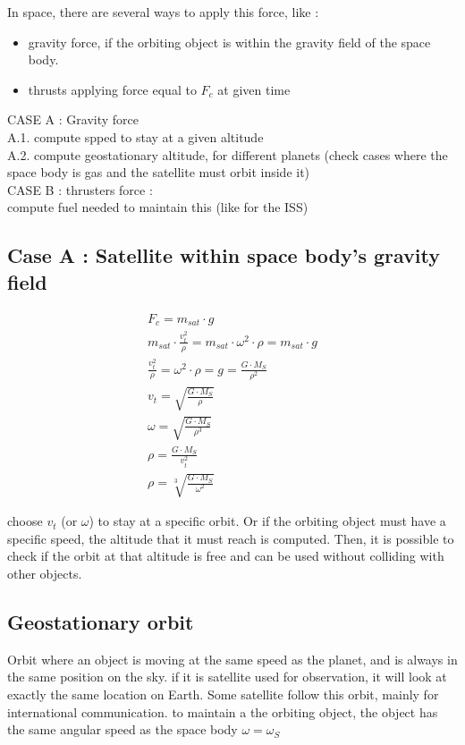 \documentclass[12pt,a4paper]{article}
\begin{document}
In space, there are several ways to apply this force, like : 
\begin{itemize}
	\item gravity force, if the orbiting object is within the gravity field of the space body.
	\item thrusts applying force equal to $F_c$ at given time
\end{itemize}

CASE A : Gravity force\\
A.1. compute spped to stay at a given altitude\\
A.2. compute geostationary altitude, for different planets (check cases where the space body is gas and the satellite must orbit inside it)\\
CASE B : thrusters force : \\
compute fuel needed to maintain this (like for the ISS)

\subsection{Case A : Satellite within space body's gravity field}

\begin{eqnarray}
	F_c = m_{sat} \cdot g \\
	m_{sat} \cdot \frac{v_t^2}{\rho}  = m_{sat} \cdot \omega^2 \cdot \rho= m_{sat} \cdot g\\
	\frac{v_t^2}{\rho} = \omega^2 \cdot \rho = g =\frac{ G \cdot M_{S}}{\rho^2}\\
	v_t = \sqrt{\frac{ G \cdot M_{S}}{\rho}}\\
	\omega = \sqrt{\frac{ G \cdot M_{S}}{\rho^3}}\\
	\rho = \frac{ G \cdot M_{S}}{v_t^2}\\
	\rho = \sqrt[3]{\frac{ G \cdot M_{S}}{\omega^2}}
\end{eqnarray}

choose $v_t$ (or $\omega$) to stay at a specific orbit. Or if the orbiting object must have a specific speed, the altitude that it must reach is computed. Then, it is possible to check if the orbit at that altitude is free and can be used without colliding with other objects.
 
\subsection{Geostationary orbit}
Orbit where an object is moving at the same speed as the planet, and is always in the same position on the sky.
if it is satellite used for observation, it will look at exactly the same location on Earth. 
Some satellite follow this orbit, mainly for international communication. 
to maintain a the orbiting object, the object has the same angular speed as the space body $\omega=\omega_{S}$
\end{document}
